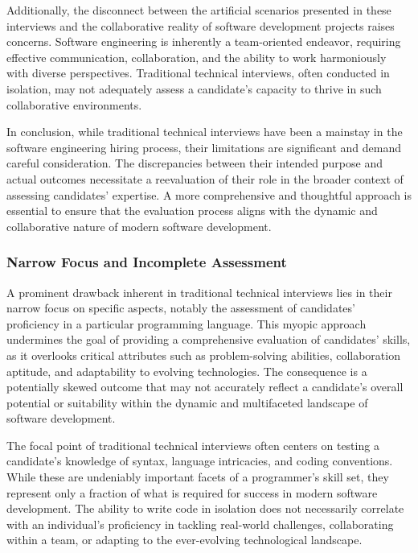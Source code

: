 \documentclass[
    a4paper, %
    10pt, %
    unnumberedsections, %
    twoside, %
]{LTJournalArticle}
\begin{document}
Additionally, the disconnect between the artificial scenarios presented in these interviews and the collaborative reality of software development projects raises concerns. Software engineering is inherently a team-oriented endeavor, requiring effective communication, collaboration, and the ability to work harmoniously with diverse perspectives. Traditional technical interviews, often conducted in isolation, may not adequately assess a candidate's capacity to thrive in such collaborative environments.

In conclusion, while traditional technical interviews have been a mainstay in the software engineering hiring process, their limitations are significant and demand careful consideration. The discrepancies between their intended purpose and actual outcomes necessitate a reevaluation of their role in the broader context of assessing candidates' expertise. A more comprehensive and thoughtful approach is essential to ensure that the evaluation process aligns with the dynamic and collaborative nature of modern software development.

\subsubsection*{Narrow Focus and Incomplete Assessment}

A prominent drawback inherent in traditional technical interviews lies in their narrow focus on specific aspects, notably the assessment of candidates' proficiency in a particular programming language. This myopic approach undermines the goal of providing a comprehensive evaluation of candidates' skills, as it overlooks critical attributes such as problem-solving abilities, collaboration aptitude, and adaptability to evolving technologies. The consequence is a potentially skewed outcome that may not accurately reflect a candidate's overall potential or suitability within the dynamic and multifaceted landscape of software development.

The focal point of traditional technical interviews often centers on testing a candidate's knowledge of syntax, language intricacies, and coding conventions. While these are undeniably important facets of a programmer's skill set, they represent only a fraction of what is required for success in modern software development. The ability to write code in isolation does not necessarily correlate with an individual's proficiency in tackling real-world challenges, collaborating within a team, or adapting to the ever-evolving technological landscape.
\end{document}
